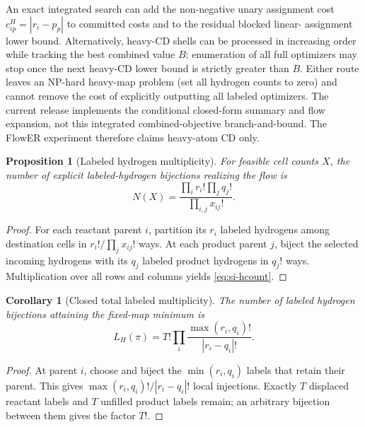 \documentclass[11pt]{article}
\newtheorem{proposition}[theorem]{Proposition}
\newtheorem{corollary}[theorem]{Corollary}
\theoremstyle{definition}
\begin{document}
An exact integrated search can add the non-negative unary assignment cost
\(c^H_{ip}=|r_i-p_p|\) to committed costs and to the residual blocked linear-
assignment lower bound.  Alternatively, heavy-CD shells can be processed in
increasing order while tracking the best combined value \(B\); enumeration of
all full optimizers may stop once the next heavy-CD lower bound is strictly
greater than \(B\).  Either route leaves an NP-hard heavy-map problem (set all
hydrogen counts to zero) and cannot remove the cost of explicitly outputting
all labeled optimizers.  The current release implements the conditional
closed-form summary and flow expansion, not this integrated combined-objective
branch-and-bound.  The FlowER experiment therefore claims heavy-atom CD only.

\begin{proposition}[Labeled hydrogen multiplicity]
For feasible cell counts \(X\), the number of explicit labeled-hydrogen
bijections realizing the flow is
\begin{equation}
 N(X)=\frac{\prod_i r_i!\prod_jq_j!}{\prod_{i,j}x_{ij}!}.
 \label{eq:si-hcount}
\end{equation}
\end{proposition}

\begin{proof}
For each reactant parent \(i\), partition its \(r_i\) labeled hydrogens among
destination cells in
\(r_i!/\prod_jx_{ij}!\) ways.  At each product parent \(j\), biject the
selected incoming hydrogens with its \(q_j\) labeled product hydrogens in
\(q_j!\) ways.  Multiplication over all rows and columns yields
\cref{eq:si-hcount}.
\end{proof}

\begin{corollary}[Closed total labeled multiplicity]
The number of labeled hydrogen bijections attaining the fixed-map minimum is
\begin{equation}
 L_H(\pi)=T!\prod_i
 \frac{\max(r_i,q_i)!}{|r_i-q_i|!}.
 \label{eq:si-h-total}
\end{equation}
\end{corollary}

\begin{proof}
At parent \(i\), choose and biject the
\(\min(r_i,q_i)\) labels that retain their parent.  This gives
\(\max(r_i,q_i)!/|r_i-q_i|!\) local injections.  Exactly \(T\) displaced
reactant labels and \(T\) unfilled product labels remain; an arbitrary
bijection between them gives the factor \(T!\).
\end{proof}
\end{document}

